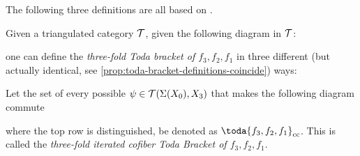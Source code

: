 The following three definitions are all based on \cite[Definition 3.1]{Christensen-Frankland_2017}.

Given a triangulated category \( {\mathcal{T}} \), given the following diagram in \( {\mathcal{T}} \):

    \begin{center}
    \end{center}

    one can define the \emph{three-fold Toda bracket of \( f_3, f_2, f_1 \)} in three different (but actually identical, see \autoref{prop:toda-bracket-definitions-coincide}) ways:

\begin{definition}
    \label{def:iterated-cofiber-toda-bracket}
    Let the set of every possible \( \psi \in {\mathcal{T}}(\Sigma(X_0), X_3) \) that makes the following diagram commute
    \begin{center}
    \end{center}
    where the top row is distinguished, be denoted as \( \toda{f_3, f_2, f_1}_{\cc} \). This is called the \emph{three-fold iterated cofiber Toda Bracket of \( f_3, f_2, f_1 \)}.
\end{definition}

